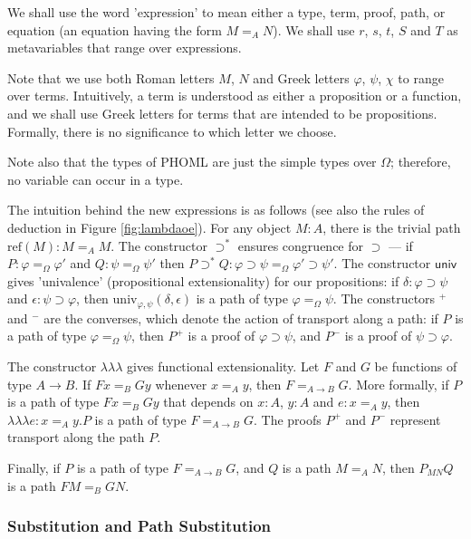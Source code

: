 \documentclass[a4paper,UKenglish]{lipics-v2016}
\newcommand*{\reff}[1]{\ensuremath{\mathrm{ref} \left( {#1} \right)}}
\newcommand*{\univ}[4]{\ensuremath{\mathrm{univ}_{{#1}, {#2}} \left({#3} , {#4} \right)}}
\newcommand*{\triplelambda}{\ensuremath{\lambda \!\! \lambda \!\! \lambda}}
\theoremstyle{plain}
\theoremstyle{definition}
\begin{document}
We shall use the word 'expression' to mean either a type, term, proof, path, or equation (an equation having the form $M =_A N$).  We shall use $r$, $s$, $t$, $S$ and $T$ as metavariables that range over expressions.

Note that we use both Roman letters $M$, $N$ and Greek letters $\varphi$, $\psi$, $\chi$ to range over terms.  Intuitively, a term is understood as either a proposition or a function,
and we shall use Greek letters for terms that are intended to be propositions.  Formally, there is no significance to which letter we choose.

Note also that the types of PHOML are just the simple types over $\Omega$; therefore, no variable can occur in a type.

The intuition behind the new expressions is as follows (see also the rules of deduction in Figure \ref{fig:lambdaoe}).  For any object $M : A$, there is the trivial path $\reff{M} : M =_A M$.  The constructor $\supset^*$ ensures congruence for $\supset$ --- if $P : \varphi =_\Omega \varphi'$ and $Q : \psi =_\Omega \psi'$ then $P \supset^* Q : \varphi \supset \psi =_\Omega \varphi' \supset \psi'$.  The constructor $\mathsf{univ}$ gives 'univalence' (propositional extensionality) for our propositions: if $\delta : \varphi \supset \psi$ and $\epsilon : \psi \supset \varphi$, then $\univ{\varphi}{\psi}{\delta}{\epsilon}$ is a path of type $\varphi =_\Omega \psi$.  The constructors $^+$ and $^-$ are the converses, which denote the action of transport along a path: if $P$ is a path of type $\varphi =_\Omega \psi$, then $P^+$ is a proof of $\varphi \supset \psi$, and $P^-$ is a proof of $\psi \supset \varphi$.  

The constructor $\triplelambda$ gives functional extensionality.  Let $F$ and $G$ be functions of type $A \rightarrow B$.  If $F x =_B G y$ whenever $x =_A y$, then $F =_{A \rightarrow B} G$.  More formally, if $P$ is a path of type $Fx =_B Gy$ that depends on $x : A$, $y : A$ and $e : x =_A y$, then $\triplelambda e : x =_A y . P$ is a path of type $F =_{A \rightarrow B} G$.  The proofs $P^+$ and $P^-$ represent transport along the path $P$.

Finally, if $P$ is a path of type $F =_{A \rightarrow B} G$, and $Q$ is a path $M =_A N$, then $P_{MN} Q$ is a path $FM =_B G N$.

\subsubsection{Substitution and Path Substitution}
\end{document}

